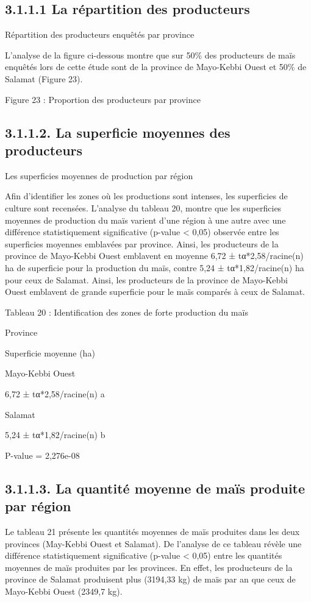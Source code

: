 \documentclass[12pt,oneside]{report}
\begin{document}
\subsection{3.1.1.1 La répartition des producteurs}
Répartition des producteurs enquêtés par province

L’analyse de la figure ci-dessous montre que sur 50\% des producteurs de maïs enquêtés lors de cette étude sont de la province de Mayo-Kebbi Ouest et 50\% de Salamat (Figure 23).

Figure 23 : Proportion des producteurs par province

\subsection{3.1.1.2. La superficie moyennes des producteurs}
Les superficies moyennes de production par région

Afin d’identifier les zones où les productions sont intenses, les superficies de culture sont recensées. L’analyse du tableau 20, montre que les superficies moyennes de production du maïs varient d’une région à une autre avec une différence statistiquement significative (p-value < 0,05) observée entre les superficies moyennes emblavées par province. Ainsi, les producteurs de la province de Mayo-Kebbi Ouest emblavent en moyenne 6,72 ± tα*2,58/racine(n) ha de superficie pour la production du maïs, contre 5,24 ± tα*1,82/racine(n) ha pour ceux de Salamat. Ainsi, les producteurs de la province de Mayo-Kebbi Ouest emblavent de grande superficie pour le maïs comparés à ceux de Salamat.

Tableau 20 : Identification des zones de forte production du maïs

Province

Superficie moyenne  (ha)

Mayo-Kebbi Ouest

6,72 ± tα*2,58/racine(n)  a

Salamat

5,24 ± tα*1,82/racine(n)  b

P-value = 2,276e-08

\subsection{3.1.1.3. La quantité moyenne de maïs produite par région}
Le tableau 21 présente les quantités moyennes de maïs produites dans les deux provinces (May-Kebbi Ouest et Salamat). De l’analyse de ce tableau révèle une différence statistiquement significative (p-value < 0,05) entre les quantités moyennes de maïs produites par les provinces. En effet, les producteurs de la province de Salamat produisent plus (3194,33 kg) de maïs par an que ceux de Mayo-Kebbi Ouest (2349,7  kg).
\end{document}
